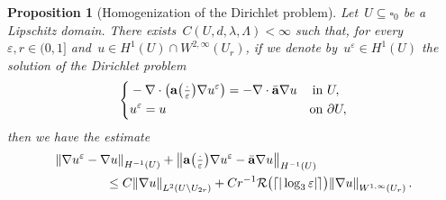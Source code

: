 \documentclass[11pt]{article} %
\let\oldsquare\square %
\renewcommand{\square}{\oldsquare}
\numberwithin{equation}{section}
\newtheorem{proposition}[theorem]{Proposition}
\theoremstyle{definition}
\let\originalleft\left
\let\originalright\right
\renewcommand{\left}{\mathopen{}\mathclose\bgroup\originalleft}
\renewcommand{\right}{\aftergroup\egroup\originalright}
\newcommand{\eps}{\varepsilon}
\newcommand{\ep}{\eps}
\renewcommand{\a}{\mathbf{a}}
\newcommand{\ahom}{\bar{\a}}
\newcommand{\cu}{\square}
\begin{document}
\begin{proposition}
[Homogenization of the Dirichlet problem]
\label{p.DP}
Let~$U \subseteq \cu_0$ be a Lipschitz domain. 
There exists~$C(U,d,\lambda,\Lambda)<\infty$ such that, for every~$\ep,r \in (0,1]$ and~$u \in H^1(U)\cap W^{2,\infty}(U_{r})$, if we denote by~$u^\ep\in H^1(U)$ the solution of the Dirichlet problem
\begin{equation*}
\left\{
\begin{aligned}
& -\nabla \cdot \left( \a\left(\tfrac \cdot\ep\right) \nabla u^\ep \right) = -\nabla \cdot \ahom \nabla u &  \mbox{in} & \ U, \\
& u^\ep = u & \mbox{on} & \ \partial U,
\end{aligned}
\right.
\end{equation*}
then we have the estimate
\begin{align}
\label{e.DP}
\lefteqn{
\left\| \nabla u^\ep - \nabla  u  \right\|_{H^{-1}(U)}  
+ \left\| \a\left(\tfrac\cdot\ep\right) \nabla u^\ep -\ahom \nabla  u  \right\|_{H^{-1}(U)}
} \qquad\qquad & 
\notag \\ &
\leq 
C \left\| \nabla u \right\|_{L^{2}(U \setminus U_{2r})} 
+
Cr^{-1} \mathcal{R}\bigl( \lceil |\log_3 \ep| \rceil \bigr) \left\|  \nabla u \right\|_{W^{1,\infty}(U_r)}
\,.
\end{align}
\end{proposition}
\end{document}
